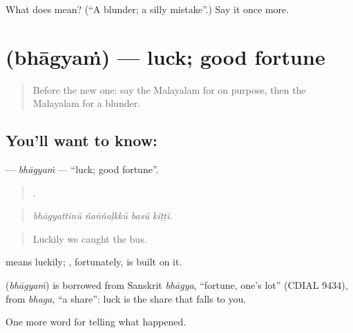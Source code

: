 \begin{tcolorbox}[breakable,colback=teal!4,colframe=teal!35!black,title={Before you move on}]
What does  mean? (\textquotedblleft{}A blunder; a silly mistake\textquotedblright{}.) Say it once more.
\end{tcolorbox}
\section[\texorpdfstring{\ml{ഭാഗ്യം} (bhāgyaṁ)}{ഭാഗ്യം (bhāgyaṁ)}]{ (bhāgyaṁ) — luck; good fortune}

\label{lesson:ML-C360-bhagyam}



\begin{quote}
Before the new one: say the Malayalam for on purpose, then the Malayalam for a blunder.
\end{quote}

\subsection*{You'll want to know: }
\textbf{} — \emph{bhāgyaṁ} — \textquotedblleft{}luck; good fortune\textquotedblright{}.

\begin{quote}
   .
\end{quote}

\begin{quote}
\emph{bhāgyattinŭ ñaṅṅaḷkkŭ basŭ kiṭṭi.}
\end{quote}

\begin{quote}
Luckily we caught the bus.
\end{quote}

 means luckily; , fortunately, is built on it.

\begin{cousinweb}
\textbf{} (\emph{bhāgyaṁ}) is borrowed from Sanskrit \emph{bhāgya}, \textquotedblleft{}fortune, one's lot\textquotedblright{} (CDIAL 9434), from \emph{bhaga}, \textquotedblleft{}a share\textquotedblright{}: luck is the share that falls to you.
\end{cousinweb}

\begin{grammarlens}[title={What you've built}]
One more word for telling what happened.
\end{grammarlens}

